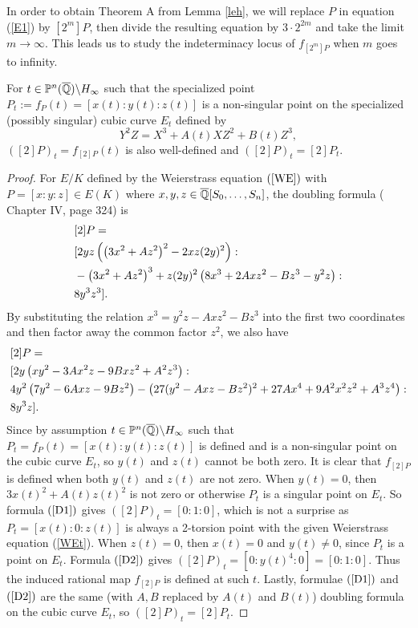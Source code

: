 \documentclass[12pt,reqno]{amsart}
\begin{document}
In order to obtain Theorem A from Lemma \ref{leh}, we will replace $P$ in equation (\ref{E1}) by $[2^m]P$, then divide the resulting equation by $3 \cdot 2^{2m}$ and take the limit $m\rightarrow \infty$. This leads us to study the indeterminacy locus of $f_{[2^m]P}$ when $m$ goes to infinity. 

\begin{lemma} \label{DL} For $t \in \mathbb{P}^n(\overline{\mathbb{Q}})\backslash H_\infty$ such that the specialized point $P_t:=f_P(t)=[x(t):y(t):z(t)]$ is a non-singular point on the specialized (possibly singular) cubic curve $E_t$ defined by \begin{equation} \label{WEt}Y^2Z=X^3+A(t)XZ^2+B(t)Z^3, \end{equation} $([2]P)_t=f_{[2]P}(t)$ is also well-defined and $([2]P)_t=[2]P_t$.
\end{lemma}   
\begin{proof} For $E/K$ defined by the Weierstrass equation $(\ref{WE})$ with $P=[x:y:z] \in E(K)$ where $x,y,z \in \overline{\mathbb{Q}}[S_0,\ldots,S_n]$, the doubling formula (\cite{SAT} Chapter IV, page 324) is
\begin{align}&[2]P=\notag \\*
&[2yz\left(\left(3x^2+Az^2\right)^2-2xz(2y)^2\right): \notag \\
&-\left(3x^2+Az^2\right)^3+z(2y)^2\left(8x^3+2Axz^2-Bz^3-y^2z\right): \notag \\
&8y^3z^3]. \label{D1} 
\end{align}
By substituting the relation $x^3=y^2z-Axz^2-Bz^3$ into the first two coordinates and then factor away the common factor $z^2$, we also have
\begin{align}&[2]P=\notag \\
&[2y\left(xy^2-3Ax^2z-9Bxz^2+A^2z^3\right): \notag \\
&4y^2\left(7y^2-6Axz-9Bz^2\right)-\left(27(y^2-Axz-Bz^2)^2+27Ax^4+9A^2x^2z^2+A^3z^4\right): \notag \\
&8y^3z]. \label{D2} 
\end{align}
Since by assumption $t\in\mathbb{P}^n(\overline{\mathbb{Q}})\backslash H_\infty$ such that $P_t=f_P(t)=[x(t):y(t):z(t)]$ is defined and is a non-singular point on the cubic curve $E_t$, so $y(t)$ and $z(t)$ cannot be both zero. It is clear that $f_{[2]P}$ is defined when both $y(t)$ and $z(t)$ are not zero. When $y(t)=0$, then $3x(t)^2+A(t)z(t)^2$ is not zero or otherwise $P_t$ is a singular point on $E_t$. So formula $(\ref{D1})$ gives $([2]P)_t=[0:1:0]$, which is not a surprise as $P_t=[x(t):0:z(t)]$ is always a 2-torsion point with the given Weierstrass equation (\ref{WEt}). When $z(t)=0$, then $x(t)=0$ and $y(t) \neq 0$, since $P_t$ is a point on $E_t$. Formula $(\ref{D2})$ gives $([2]P)_t=[0:y(t)^4:0]=[0:1:0]$. Thus the induced rational map $f_{[2]P}$ is defined at such $t$. Lastly, formulae $(\ref{D1})$ and $(\ref{D2})$ are the same (with $A,B$ replaced by $A(t)$ and $B(t)$) doubling formula on the cubic curve $E_t$, so $([2]P)_t=[2]P_t$. 
\end{proof}
\end{document}
